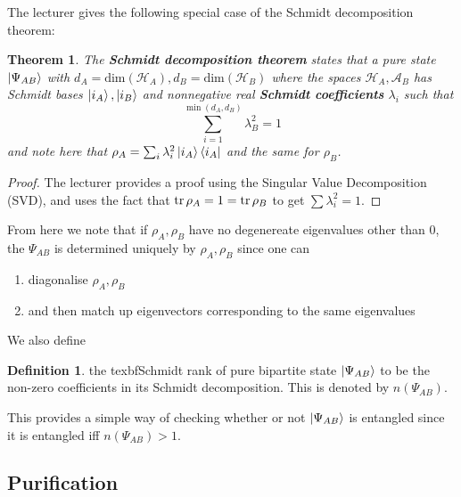 \documentclass{article}
\newtheorem{theorem}{Theorem}
\theoremstyle{definition}
\newtheorem{definition}{Definition}
\begin{document}
The lecturer gives the following special case of the Schmidt decomposition theorem:

\begin{theorem}
	The \textbf{Schmidt decomposition theorem} states that a pure state 
	$\ket{\Psi_{AB}}$ with $d_A = \text{dim}(\mathcal{H}_A), 
	d_B = \text{dim}(\mathcal{H}_B)$ where the spaces 
	$\mathcal{H}_A, \mathcal{A}_B$ has Schmidt bases $\ket{i_A}, \ket{i_B}$ 
	and nonnegative real \textbf{Schmidt coefficients} $\lambda_i$ such that
	\begin{equation}
		\sum_{i = 1}^{\min(d_A, d_B)} \lambda_B^2 = 1
  \end{equation}
  and note here that $\rho_A = \sum_i \lambda_i^2 \ket{i_A} \bra{i_A}$ and 
  the same for $\rho_B$.
\end{theorem}
\begin{proof}
  The lecturer provides a proof using the Singular Value Decomposition (SVD), and uses the fact that $\tr \rho_A = 1 = \tr \rho_B$ to get $\sum \lambda_i^2 = 1$.
\end{proof}

From here we note that if $\rho_A, \rho_B$ have no degenereate eigenvalues 
other than $0$, the  $\Psi_{AB}$ is determined uniquely by $\rho_A, \rho_B$ 
since one can
\begin{enumerate}
  \item diagonalise $\rho_A, \rho_B$
  \item and then match up eigenvectors corresponding to the same eigenvalues
\end{enumerate}

We also define
\begin{definition}
  the texbf{Schmidt rank} of pure bipartite state $\ket{\Psi_{AB}}$ to be the
  non-zero coefficients in its Schmidt decomposition. This is denoted by
  $n(\Psi_{AB})$.
\end{definition}
This provides a simple way of checking whether or not $\ket{\Psi_{AB}}$ is
entangled since it is entangled iff $n(\Psi_{AB}) > 1$.

\subsection{Purification}
\end{document}

